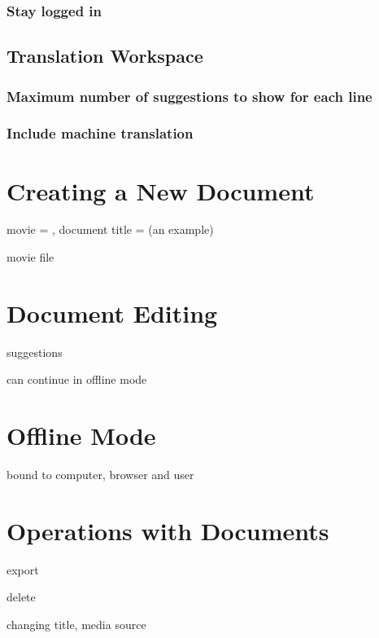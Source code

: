 \subsubsection{Stay logged in}

\subsection{Translation Workspace}
\subsubsection{Maximum number of suggestions to show for each line}
\subsubsection{Include machine translation}

\section{Creating a New Document}

movie = , document title =
(an example)

movie file

\section{Document Editing}

suggestions

can continue in offline mode

\section{Offline Mode}

bound to computer, browser and user

\section{Operations with Documents}

export

delete

changing title, media source